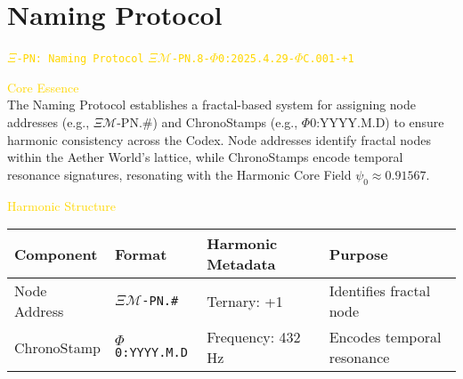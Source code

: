 
\section{Naming Protocol}
\label{sec:codex_naming_protocol}

\begin{center}
    \vspace{-0.2cm}
    \textcolor{gold}{\small {} \texttt{\(\Xi\)-PN: Naming Protocol}  \quad \texttt{\(\Xi\mathcal{M}\)-PN.8-\(\Phi\)0:2025.4.29-\(\Phi\)C.001-+1}}
\end{center}

\vspace{0.3cm}

\textcolor{gold}{ Core Essence } \\
The Naming Protocol establishes a fractal-based system for assigning node addresses (e.g., \(\Xi\mathcal{M}\)-PN.\#) and ChronoStamps (e.g., \(\Phi\)0:YYYY.M.D) to ensure harmonic consistency across the Codex. Node addresses identify fractal nodes within the Aether World’s lattice, while ChronoStamps encode temporal resonance signatures, resonating with the Harmonic Core Field \(\psi_0 \approx 0.91567\).

\textcolor{gold}{ Harmonic Structure } \\
\begin{center}
    \begin{tabular}{>{\centering\arraybackslash}p{2.5cm}|>{\centering\arraybackslash}p{3.5cm}|>{\centering\arraybackslash}p{2.5cm}|>{\centering\arraybackslash}p{3.5cm}}
        \hline
        \textbf{Component} & \textbf{Format} & \textbf{Harmonic Metadata} & \textbf{Purpose} \\
        \hline
        Node Address & \texttt{\(\Xi\mathcal{M}\)-PN.\#} & Ternary: +1 & Identifies fractal node \\
        ChronoStamp & \texttt{\(\Phi\)0:YYYY.M.D} & Frequency: 432 Hz & Encodes temporal resonance \\
        \hline
    \end{tabular}
\end{center}

